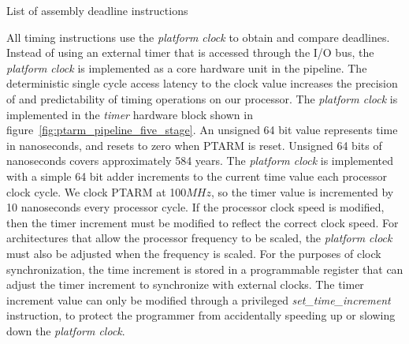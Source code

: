 \begin{table}[h]
\noindent{}
\vspace{1mm}
\caption{List of assembly deadline instructions}
\label{table_deadline_insts}
\end{table}

All timing instructions use the \emph{platform clock} to obtain and compare deadlines.
Instead of using an external timer that is accessed through the I/O bus, the \emph{platform clock} is implemented as a core hardware unit in the pipeline.  
The deterministic single cycle access latency to the clock value increases the precision of and predictability of timing operations on our processor.  
The \emph{platform clock} is implemented in the \emph{timer} hardware block shown in figure~\ref{fig:ptarm_pipeline_five_stage}.   
An unsigned 64 bit value represents time in nanoseconds, and resets to zero when PTARM is reset.
Unsigned 64 bits of nanoseconds covers approximately 584 years. 
The \emph{platform clock} is implemented with a simple 64 bit adder increments to the current time value each processor clock cycle. 
We clock PTARM at 100$MHz$, so the timer value is incremented by 10 nanoseconds every processor cycle.
If the processor clock speed is modified, then the timer increment must be modified to reflect the correct clock speed. 
For architectures that allow the processor frequency to be scaled, the \emph{platform clock} must also be adjusted when the frequency is scaled.  
For the purposes of clock synchronization, the time increment is stored in a programmable register that can adjust the timer increment to synchronize with external clocks. 
The timer increment value can only be modified through a privileged \emph{set\_time\_increment} instruction, to protect the programmer from accidentally speeding up or slowing down the \emph{platform clock}.


